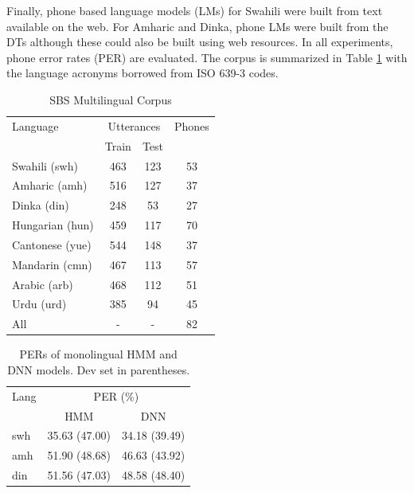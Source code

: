 \documentclass[a4paper]{article}
\begin{document}
Finally, phone based language models (LMs) for Swahili were built from text available on the web. For Amharic and Dinka, phone LMs were built from the DTs although these could also be built using web resources. In all experiments, phone error rates (PER) are evaluated. The corpus is summarized in Table \ref{Tab:SBS Corpus} with the language acronyms borrowed from ISO 639-3 codes.
%
\begin{table}[t]
\begin{center}
\caption{SBS Multilingual Corpus}
\label{Tab:SBS Corpus}
\begin{tabular}{l|c c| c}
   \hline
Language &  \multicolumn{2}{c|}{Utterances}  & Phones \\ 
                 &  Train & Test &  \\ \hline
Swahili (swh)     & 463 & 123 & 53 \\
Amharic (amh)     & 516 & 127 & 37 \\
Dinka   (din)     & 248 &  53 & 27 \\ 
Hungarian (hun)    & 459 & 117 & 70 \\ 
Cantonese (yue)  & 544 & 148 &  37 \\ 
Mandarin (cmn) & 467 & 113 &  57 \\ 
Arabic (arb) & 468 & 112 &  51 \\ 
Urdu (urd) & 385 & 94 &  45 \\ \hline
All & - & - & 82 \\ \hline
\end{tabular}
\vspace{-5mm}
\end{center}
\end{table}

\begin{table}
\centering %
\caption{PERs of monolingual HMM and DNN models. Dev set in parentheses.}
\begin{tabular}{l|c c}
   \hline
Lang  & \multicolumn{2}{c}{PER (\%)} \\
          & HMM     & DNN   \\ \hline
swh        & 35.63 (47.00)   & 34.18 (39.49)   \\
amh        & 51.90 (48.68)   & 46.63 (43.92)   \\ 
din        & 51.56 (47.03)   & 48.58 (48.40)  \\ \hline 
\end{tabular}
\vspace{-2mm}
\label{Tab:PER_Matched_Monolingual}
\end{table}
\end{document}
